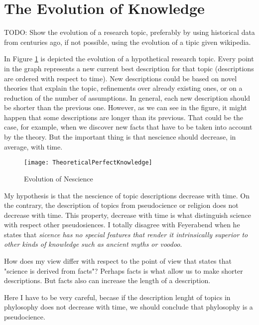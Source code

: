 %
%
\section{The Evolution of Knowledge}

{\color{red} TODO: Show the evolution of a research topic, preferably by using historical data from centuries ago, if not possible, using the evolution of a tipic given wikipedia.}

\begin{example}
In Figure \ref{fig:TheoreticalPerfectKnowledge} is depicted the evolution of a hypothetical research topic. Every point in the graph represents a new current best description for that topic (descriptions are ordered with respect to time). New descriptions could be based on novel theories that explain the topic, refinements over already existing ones, or on a reduction of the number of assumptions. In general, each new description should be shorter than the previous one. However, as we can see in the figure, it might happen that some descriptions are longer than its previous. That could be the case, for example, when we discover new facts that have to be taken into account by the theory. But the important thing is that nescience should decrease, in average, with time.
\end{example}

\begin{figure}[h]
\centering\texttt{[image: TheoreticalPerfectKnowledge]}
\caption{\label{fig:TheoreticalPerfectKnowledge}Evolution of Nescience}
\end{figure}

My hypothesis is that the nescience of topic descriptions decrease with time. On the contrary, the description of topics from pseudocience or religion does not decrease with time. This property, decrease with time is what distinguish science with respect other pseudosiences. I totally disagree with Feyerabend when he states that \emph{sicence has no special features that render it intrinsically superior to other kinds of knowledge such as ancient myths or voodoo}.

How does my view differ with respect to the point of view that states that "science is derived from facts"? Perhaps facts is what allow us to make shorter descriptions. But facts also can increase the length of a description.

Here I have to be very careful, becase if the description lenght of topics in phylosophy does not decrease with time, we should conclude that phylosophy is a pseudocience.

